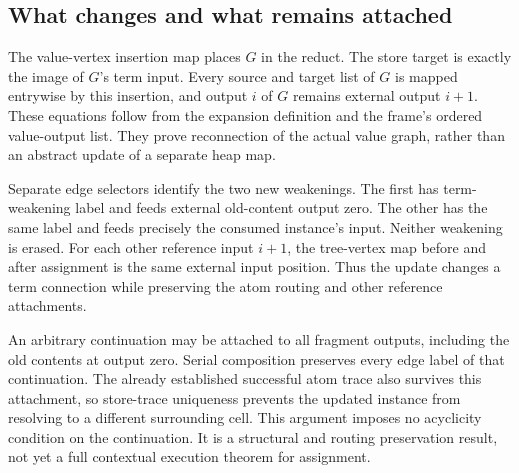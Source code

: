 
\subsection{What changes and what remains attached}

The value-vertex insertion map places $G$ in the reduct. The store target
is exactly the image of $G$'s term input. Every source and target list of
$G$ is mapped entrywise by this insertion, and output $i$ of $G$ remains
external output $i+1$. These equations follow from the expansion definition
and the frame's ordered value-output list. They prove reconnection of the
actual value graph, rather than an abstract update of a separate heap map.






Separate edge selectors identify the two new weakenings. The first has
term-weakening label and feeds external old-content output zero. The other
has the same label and feeds precisely the consumed instance's input.
Neither weakening is erased. For each other reference input $i+1$, the
tree-vertex map before and after assignment is the same external input
position. Thus the update changes a term connection while preserving the
atom routing and other reference attachments.






An arbitrary continuation may be attached to all fragment outputs, including
the old contents at output zero. Serial composition preserves every edge
label of that continuation. The already established successful atom trace
also survives this attachment, so store-trace uniqueness prevents the
updated instance from resolving to a different surrounding cell. This
argument imposes no acyclicity condition on the continuation. It is a
structural and routing preservation result, not yet a full contextual
execution theorem for assignment.

